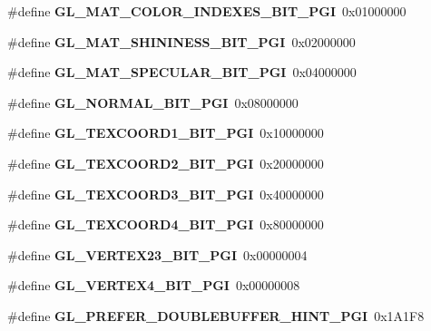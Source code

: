 \begin{DoxyCompactItemize}
\item 
\#define {\bfseries G\+L\+\_\+\+M\+A\+T\+\_\+\+C\+O\+L\+O\+R\+\_\+\+I\+N\+D\+E\+X\+E\+S\+\_\+\+B\+I\+T\+\_\+\+P\+G\+I}~0x01000000\label{_s_d_l__opengl_8h_a9bd98e7b1d959505b66aefe7fa1c1112}

\item 
\#define {\bfseries G\+L\+\_\+\+M\+A\+T\+\_\+\+S\+H\+I\+N\+I\+N\+E\+S\+S\+\_\+\+B\+I\+T\+\_\+\+P\+G\+I}~0x02000000\label{_s_d_l__opengl_8h_adb03fd592f6fb520fcaca8fed29f5283}

\item 
\#define {\bfseries G\+L\+\_\+\+M\+A\+T\+\_\+\+S\+P\+E\+C\+U\+L\+A\+R\+\_\+\+B\+I\+T\+\_\+\+P\+G\+I}~0x04000000\label{_s_d_l__opengl_8h_a10192f4dd4f4cdba4f8588ea1ed49a91}

\item 
\#define {\bfseries G\+L\+\_\+\+N\+O\+R\+M\+A\+L\+\_\+\+B\+I\+T\+\_\+\+P\+G\+I}~0x08000000\label{_s_d_l__opengl_8h_a57b5d29d9c0b8aa51c492fa5db4de4f0}

\item 
\#define {\bfseries G\+L\+\_\+\+T\+E\+X\+C\+O\+O\+R\+D1\+\_\+\+B\+I\+T\+\_\+\+P\+G\+I}~0x10000000\label{_s_d_l__opengl_8h_ad13b926bfef685f2ab8f39609273c5cc}

\item 
\#define {\bfseries G\+L\+\_\+\+T\+E\+X\+C\+O\+O\+R\+D2\+\_\+\+B\+I\+T\+\_\+\+P\+G\+I}~0x20000000\label{_s_d_l__opengl_8h_a43296f075b84e5fe6ff5d52e093021c9}

\item 
\#define {\bfseries G\+L\+\_\+\+T\+E\+X\+C\+O\+O\+R\+D3\+\_\+\+B\+I\+T\+\_\+\+P\+G\+I}~0x40000000\label{_s_d_l__opengl_8h_a8c57b3914e46f4cc7ac2c91ba48e7d98}

\item 
\#define {\bfseries G\+L\+\_\+\+T\+E\+X\+C\+O\+O\+R\+D4\+\_\+\+B\+I\+T\+\_\+\+P\+G\+I}~0x80000000\label{_s_d_l__opengl_8h_aae7878ca38fd3c5119f2d542df7aa7c9}

\item 
\#define {\bfseries G\+L\+\_\+\+V\+E\+R\+T\+E\+X23\+\_\+\+B\+I\+T\+\_\+\+P\+G\+I}~0x00000004\label{_s_d_l__opengl_8h_a10d8c2d513d9176b149a2b274b5ca2cf}

\item 
\#define {\bfseries G\+L\+\_\+\+V\+E\+R\+T\+E\+X4\+\_\+\+B\+I\+T\+\_\+\+P\+G\+I}~0x00000008\label{_s_d_l__opengl_8h_ac002ce97dfb1d8c69be39bc447166b46}

\item 
\#define {\bfseries G\+L\+\_\+\+P\+R\+E\+F\+E\+R\+\_\+\+D\+O\+U\+B\+L\+E\+B\+U\+F\+F\+E\+R\+\_\+\+H\+I\+N\+T\+\_\+\+P\+G\+I}~0x1\+A1\+F8\label{_s_d_l__opengl_8h_a54e08df09931f370cd71a9e9b11edf20}


\end{DoxyCompactItemize}

